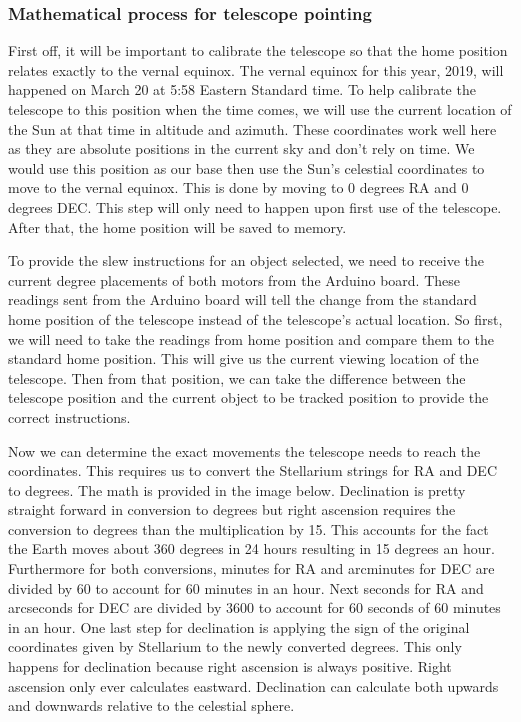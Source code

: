\documentclass[12pt]{report}
\begin{document}
\subsubsection*{Mathematical process for telescope pointing}

First off, it will be important to calibrate the telescope so that the home position relates exactly to the vernal equinox. The vernal equinox for this year, 2019, will happened on March 20 at 5:58 Eastern Standard time. To help calibrate the telescope to this position when the time comes, we will use the current location of the Sun at that time in altitude and azimuth. These coordinates work well here as they are absolute positions in the current sky and don’t rely on time. We would use this position as our base then use the Sun’s celestial coordinates to move to the vernal equinox. This is done by moving to 0 degrees RA and 0 degrees DEC. This step will only need to happen upon first use of the telescope. After that, the home position will be saved to memory.

To provide the slew instructions for an object selected, we need to receive the current degree placements of both motors from the Arduino board. These readings sent from the Arduino board will tell the change from the standard home position of the telescope instead of the telescope’s actual location. So first, we will need to take the readings from home position and compare them to the standard home position. This will give us the current viewing location of the telescope. Then from that position, we can take the difference between the telescope position and the current object to be tracked position to provide the correct instructions.

Now we can determine the exact movements the telescope needs to reach the coordinates. This requires us to convert the Stellarium strings for RA and DEC to degrees. The math is provided in the image below. Declination is pretty straight forward in conversion to degrees but right ascension requires the conversion to degrees than the multiplication by 15. This accounts for the fact the Earth moves about 360 degrees in 24 hours resulting in 15 degrees an hour. Furthermore for both conversions, minutes for RA and arcminutes for DEC are divided by 60 to account for 60 minutes in an hour. Next seconds  for RA and arcseconds for DEC are divided by 3600 to account for 60 seconds of 60 minutes in an hour. One last step for declination is applying the sign of the original coordinates given by Stellarium to the newly converted degrees. This only happens for declination because right ascension is always positive. Right ascension only ever calculates eastward. Declination can calculate both upwards and downwards relative to the celestial sphere.
\end{document}
